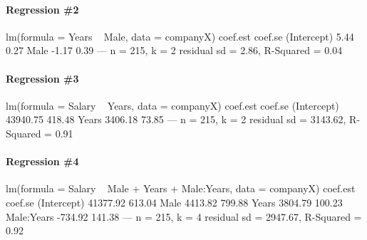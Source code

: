 \documentclass[addpoints,12pt]{exam}
\begin{document}
\begin{questions}
\paragraph{\footnotesize Regression \#2}
\begin{boxedverbatim}
lm(formula = Years ~ Male, data = companyX)
            coef.est coef.se
(Intercept)  5.44     0.27  
Male        -1.17     0.39  
---
n = 215, k = 2
residual sd = 2.86, R-Squared = 0.04
\end{boxedverbatim}
\vspace{-1em}

\paragraph{\footnotesize Regression \#3}
\begin{boxedverbatim}
lm(formula = Salary ~ Years, data = companyX)
            coef.est coef.se 
(Intercept) 43940.75   418.48
Years        3406.18    73.85
---
n = 215, k = 2
residual sd = 3143.62, R-Squared = 0.91
\end{boxedverbatim}
\vspace{-1em}

\paragraph{\footnotesize Regression \#4}
\begin{boxedverbatim}
lm(formula = Salary ~ Male + Years + Male:Years, data = companyX)
              coef.est coef.se 
(Intercept)   41377.92   613.04
Male           4413.82   799.88
Years          3804.79   100.23
Male:Years     -734.92   141.38
---
n = 215, k = 4
residual sd = 2947.67, R-Squared = 0.92
\end{boxedverbatim}


\end{questions}
\end{document}
